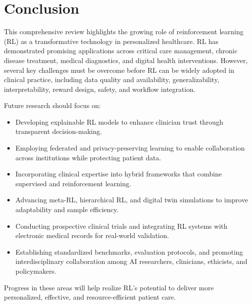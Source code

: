 \documentclass[runningheads]{llncs}
\begin{document}
\section{Conclusion}
This comprehensive review highlights the growing role of reinforcement learning (RL) as a transformative technology in personalized healthcare. RL has demonstrated promising applications across critical care management, chronic disease treatment, medical diagnostics, and digital health interventions. However, several key challenges must be overcome before RL can be widely adopted in clinical practice, including data quality and availability, generalizability, interpretability, reward design, safety, and workflow integration.

Future research should focus on:
\begin{itemize}
    \item Developing explainable RL models to enhance clinician trust through transparent decision-making.
    \item Employing federated and privacy-preserving learning to enable collaboration across institutions while protecting patient data.
    \item Incorporating clinical expertise into hybrid frameworks that combine supervised and reinforcement learning.
    \item Advancing meta-RL, hierarchical RL, and digital twin simulations to improve adaptability and sample efficiency.
    \item Conducting prospective clinical trials and integrating RL systems with electronic medical records for real-world validation.
    \item Establishing standardized benchmarks, evaluation protocols, and promoting interdisciplinary collaboration among AI researchers, clinicians, ethicists, and policymakers.
\end{itemize}

Progress in these areas will help realize RL's potential to deliver more personalized, effective, and resource-efficient patient care.


\end{document}
